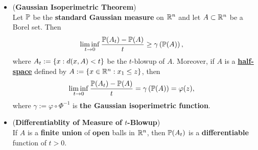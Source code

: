 \documentclass[11pt]{article}
\begin{document}
\begin{itemize}
\item \begin{theorem} (\textbf{Gaussian Isoperimetric Theorem}) \citep{boucheron2013concentration} \citep{boucheron2013concentration, vershynin2018high, wainwright2019high}\\
Let ${\mathbb P}$ be the \textbf{standard Gaussian measure} on ${\mathbb R}^n$ and let $A \subset {\mathbb R}^n$ be a Borel set. Then 
\begin{align}
\liminf\limits_{t \to 0}\frac{{\mathbb P}(A_t) - {\mathbb P}(A)}{t} &\ge \gamma\left({\mathbb P}(A)\right), \label{ineqn: gaussian_isoperimetric_inequality}
\end{align} where $A_t := \left\{x: d(x, A) < t\right\}$ be the $t$-blowup of $A$. Moreover, if $A$ is a \underline{\textbf{half-space}} defined by $A := \left\{x \in {\mathbb R}^n: x_1 \le z\right\}$, then 
\begin{align}
\liminf\limits_{t \to 0}\frac{{\mathbb P}(A_t) - {\mathbb P}(A)}{t} &= \gamma\left({\mathbb P}(A)\right) = \varphi(z), \label{ineqn: gaussian_isoperimetric_inequality_half_space}
\end{align}  where $\gamma := \varphi \circ \Phi^{-1}$ is \textbf{the Gaussian isoperimetric function}.
\end{theorem}

\item \begin{proposition} \label{prop: diff_t_blowup} (\textbf{Differentiablity of Measure of $t$-Blowup}) \citep{boucheron2013concentration}\\
If $A$ is a \textbf{finite union} of \textbf{open} balls in ${\mathbb R}^n$, then ${\mathbb P}(A_t)$ is a \textbf{differentiable} function of $t > 0$.
\end{proposition}


\end{itemize}
\end{document}
